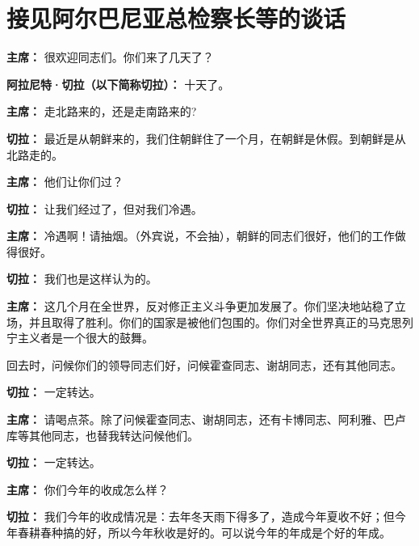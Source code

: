\section[接见阿尔巴尼亚总检察长等的谈话（一九六三年十一月十五日）]{接见阿尔巴尼亚总检察长等的谈话}

\begin{duihua}

\item[\textbf{主席：}] 很欢迎同志们。你们来了几天了？

\item[\textbf{阿拉尼特·切拉（以下简称切拉）：}] 十天了。

\item[\textbf{主席：}] 走北路来的，还是走南路来的?

\item[\textbf{切拉：}] 最近是从朝鲜来的，我们住朝鲜住了一个月，在朝鲜是休假。到朝鲜是从北路走的。

\item[\textbf{主席：}] 他们让你们过？

\item[\textbf{切拉：}] 让我们经过了，但对我们冷遇。

\item[\textbf{主席：}] 冷遇啊！请抽烟。（外宾说，不会抽），朝鲜的同志们很好，他们的工作做得很好。

\item[\textbf{切拉：}] 我们也是这样认为的。

\item[\textbf{主席：}] 这几个月在全世界，反对修正主义斗争更加发展了。你们坚决地站稳了立场，并且取得了胜利。你们的国家是被他们包围的。你们对全世界真正的马克思列宁主义者是一个很大的鼓舞。

回去时，问候你们的领导同志们好，问候霍查同志、谢胡同志，还有其他同志。

\item[\textbf{切拉：}] 一定转达。

\item[\textbf{主席：}] 请喝点茶。除了问候霍查同志、谢胡同志，还有卡博同志、阿利雅、巴卢库等其他同志，也替我转达问候他们。

\item[\textbf{切拉：}] 一定转达。

\item[\textbf{主席：}] 你们今年的收成怎么样？

\item[\textbf{切拉：}] 我们今年的收成情况是：去年冬天雨下得多了，造成今年夏收不好；但今年春耕春种搞的好，所以今年秋收是好的。可以说今年的年成是个好的年成。


\end{duihua}
